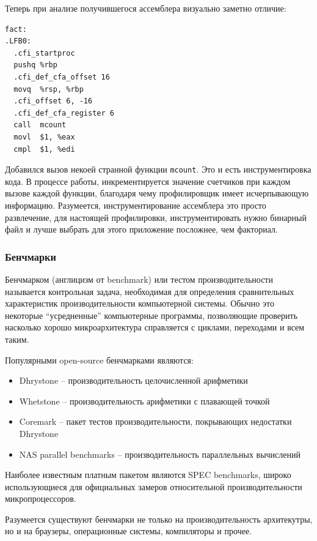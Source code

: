 \documentclass[a4paper,12pt,oneside]{article}
\begin{document}
Теперь при анализе получившегося ассемблера визуально заметно отличие:

\begin{verbatim}
fact:
.LFB0:
  .cfi_startproc
  pushq %rbp
  .cfi_def_cfa_offset 16
  movq  %rsp, %rbp
  .cfi_offset 6, -16
  .cfi_def_cfa_register 6
  call  mcount
  movl  $1, %eax
  cmpl  $1, %edi
\end{verbatim}

Добавился вызов некоей странной функции \lstinline!mcount!. Это и есть инструментировка кода. В процессе работы, инкрементируется значение счетчиков при каждом вызове каждой функции, благодаря чему профилировщик имеет исчерпывающую информацию. Разумеется, инструментирование ассемблера это просто развлечение, для настоящей профилировки, инструментировать нужно бинарный файл и лучше выбрать для этого приложение посложнее, чем факториал.

\subsubsection{Бенчмарки}\label{subsubsec:Benchs}

Бенчмарком (англицизм от benchmark) или тестом производительности называется контрольная задача, необходимая для определения сравнительных характеристик производительности компьютерной системы. Обычно это некоторые ``усредненные'' компьютерные программы, позволяющие проверить насколько хорошо микроархитектура справляется с циклами, переходами и всем таким.

Популярными open-source бенчмарками являются:

\begin{itemize}
\item Dhrystone -- производительность целочисленной арифметики
\item Whetstone -- производительность арифметики с плавающей точкой
\item Coremark -- пакет тестов производительности, покрывающих недостатки Dhrystone
\item NAS parallel benchmarks -- производительность параллельных вычислений
\end{itemize}

Наиболее известным платным пакетом являются SPEC benchmarks, широко использующиеся для официальных замеров относительной производительности микропроцессоров.

Разумеется существуют бенчмарки не только на производительность архитекутры, но и на браузеры, операционные системы, компиляторы и прочее.
\end{document}
